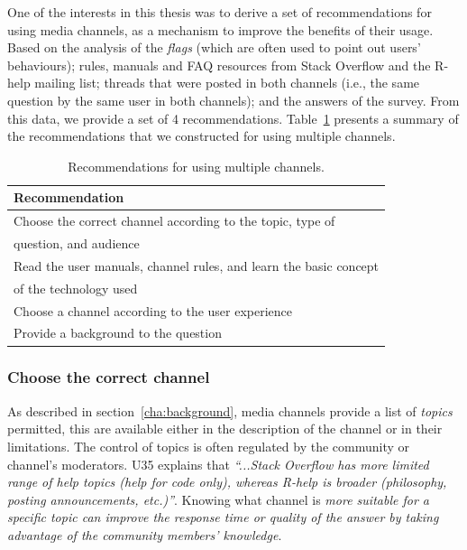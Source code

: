 \documentclass{sig-alternate-05-2015}
\begin{document}
	One of the interests in this thesis was to derive a set of recommendations for using media channels, as a mechanism to improve the benefits of their usage.
	Based on the analysis of the \textit{flags} (which are often used to point out users' behaviours); rules, manuals and FAQ resources from Stack Overflow and the R-help mailing list; threads that were posted in both channels (i.e., the same question by the same user in both channels); and the answers of the survey.
	From this data, we provide a set of 4 recommendations.
	Table~\ref{table:recomendations} presents a summary of the recommendations that we constructed for using multiple channels.

    \begin{table}[!htb]
      \centering
	  \caption{Recommendations for using multiple channels.}
	  \label{table:recomendations}
	  \begin{tabular}{@{}l@{}}
        \toprule
        \textbf{Recommendation}\\
        \midrule
			Choose the correct channel according to the topic, type of\\
		    \hspace{3em}question, and audience \\
			Read the user manuals, channel rules, and learn the basic concept\\
			\hspace{3em}of the technology used \\
			Choose a channel according to the user experience \\
			Provide a background to the question \\
        \bottomrule
	  \end{tabular}
	\end{table}

	\subsubsection{Choose the correct channel}

		As described in section~\ref{cha:background}, media channels provide a list of \textit{topics} permitted, this are available either in the description of the channel or in their limitations.
		The control of topics is often regulated by the community or channel's moderators.
		U35 explains that \textit{``...Stack Overflow has more limited range of help topics (help for code only), whereas R-help is broader (philosophy, posting announcements, etc.)''}.
		Knowing what channel is \emph{more suitable for a specific topic can improve the response time or quality of the answer by taking advantage of the community members' knowledge}.
\end{document}

